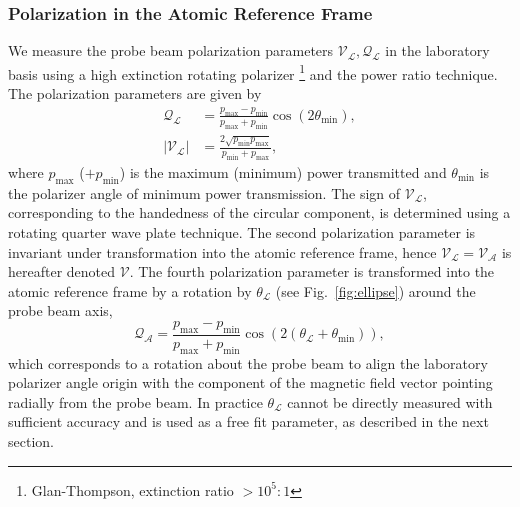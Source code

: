 \documentclass[%
 amsmath,amssymb,
aps,
]{revtex4-2}
\newcommand{\pderivn}[3][{}]{
    \frac{\partial^{#1} #2}{\partial #3^{#1}}
}
\begin{document}

 \subsubsection{Polarization in the Atomic Reference Frame}
 We measure the probe beam polarization parameters \(\mathcal{V_{L}},\mathcal{Q_{L}}\) in the laboratory basis using a high extinction rotating polarizer \footnote{Glan-Thompson, extinction ratio $>10^{5}:1$} and the power ratio technique. The polarization parameters are given by
 \begin{align}
     \mathcal{Q_{L}} &=\frac{p_{\mathrm{max}}-p_{\mathrm{min}}}{p_{\mathrm{max}}+p_{\mathrm{min}}} \cos(2\theta_{\mathrm{min}}), \\
     |\mathcal{V}_{\mathcal{L}}| &= \frac{2\sqrt{p_{\mathrm{min}}p_{\mathrm{max}}}}{p_{\mathrm{min}}+p_{\mathrm{max}}},
\end{align}
where \(p_{\mathrm{max}}\) (\(+p_{\mathrm{min}}\)) is the maximum (minimum) power transmitted and $\theta_{\mathrm{min}}$ is the polarizer angle of minimum power transmission. The sign of \(\mathcal{V}_{\mathcal{L}}\), corresponding to the handedness of the circular component, is determined using a rotating quarter wave plate technique. The second polarization parameter is invariant under transformation into the atomic reference frame, hence \(\mathcal{V_{L}}=\mathcal{V_{A}}\) is hereafter denoted \(\mathcal{V}\). The fourth polarization parameter is transformed into the atomic reference frame by a rotation by \(\mathcal{\theta_{L}}\) (see Fig.~\ref{fig:ellipse}) around the probe beam axis,
\begin{equation}
 \mathcal{Q_{A}} =\frac{p_{\mathrm{max}}-p_{\mathrm{min}}}{p_{\mathrm{max}}+p_{\mathrm{min}}} \cos(2(\mathcal{\theta_{L}}+\theta_{\mathrm{min}})) ,
\end{equation}
which corresponds to a rotation about the probe beam to align the laboratory polarizer angle origin with the component of the magnetic field vector pointing radially from the probe beam. In practice \(\mathcal{\theta_{L}}\) cannot be directly measured with sufficient accuracy and is used as a free fit parameter, as described in the next section.
 
\end{document}
